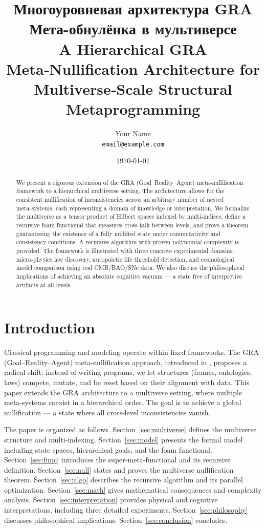 \documentclass[12pt]{article}
\title{Многоуровневая архитектура GRA Мета-обнулёнка в мультиверсе \\
\large A Hierarchical GRA Meta‑Nullification Architecture for Multiverse‑Scale Structural Metaprogramming}
\author{Your Name \\ \texttt{email@example.com}}
\date{\today}
\theoremstyle{definition}
\begin{document}
\maketitle

\begin{abstract}
We present a rigorous extension of the GRA (Goal–Reality–Agent) meta‑nullification framework to a hierarchical multiverse setting. The architecture allows for the consistent nullification of inconsistencies across an arbitrary number of nested meta‑systems, each representing a domain of knowledge or interpretation. We formalize the multiverse as a tensor product of Hilbert spaces indexed by multi‑indices, define a recursive foam functional that measures cross‑talk between levels, and prove a theorem guaranteeing the existence of a fully nullified state under commutativity and consistency conditions. A recursive algorithm with proven polynomial complexity is provided. The framework is illustrated with three concrete experimental domains: micro‑physics law discovery, autopoietic life threshold detection, and cosmological model comparison using real CMB/BAO/SNe data. We also discuss the philosophical implications of achieving an absolute cognitive vacuum — a state free of interpretive artifacts at all levels.
\end{abstract}

\section{Introduction}

Classical programming and modeling operate within fixed frameworks. The GRA (Goal–Reality–Agent) meta‑nullification approach, introduced in \cite{gra2025}, proposes a radical shift: instead of writing programs, we let structures (frames, ontologies, laws) compete, mutate, and be reset based on their alignment with data. This paper extends the GRA architecture to a multiverse setting, where multiple meta‑systems coexist in a hierarchical order. The goal is to achieve a global nullification — a state where all cross‑level inconsistencies vanish.

The paper is organized as follows. Section~\ref{sec:multiverse} defines the multiverse structure and multi‑indexing. Section~\ref{sec:model} presents the formal model including state spaces, hierarchical goals, and the foam functional. Section~\ref{sec:func} introduces the super‑meta‑functional and its recursive definition. Section~\ref{sec:null} states and proves the multiverse nullification theorem. Section~\ref{sec:algo} describes the recursive algorithm and its parallel optimization. Section~\ref{sec:math} gives mathematical consequences and complexity analysis. Section~\ref{sec:interpretation} provides physical and cognitive interpretations, including three detailed experiments. Section~\ref{sec:philosophy} discusses philosophical implications. Section~\ref{sec:conclusion} concludes.
\end{document}
